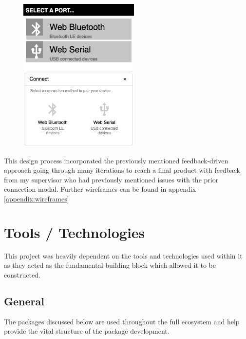 \documentclass{l4proj}
\begin{document}
\begin{figure}[!ht]
  \centering
  \includegraphics[width=6cm]{dissertation/images/old-modal-design.png}
  \includegraphics[width=6cm]{dissertation/images/new-modal-design.png}
  \label{fig:connection-modal}

\end{figure}

This design process incorporated the previously mentioned feedback-driven approach going through many iterations to reach a final product with feedback from my supervisor who had previously mentioned issues with the prior connection modal. Further wireframes can be found in appendix \ref{appendix:wireframes}


\chapter{Tools / Technologies}

This project was heavily dependent on the tools and technologies used within it as they acted as the fundamental building block which allowed it to be constructed.

\section{General}

The packages discussed below are used throughout the full ecosystem and help provide the vital structure of the package development.
\end{document}
